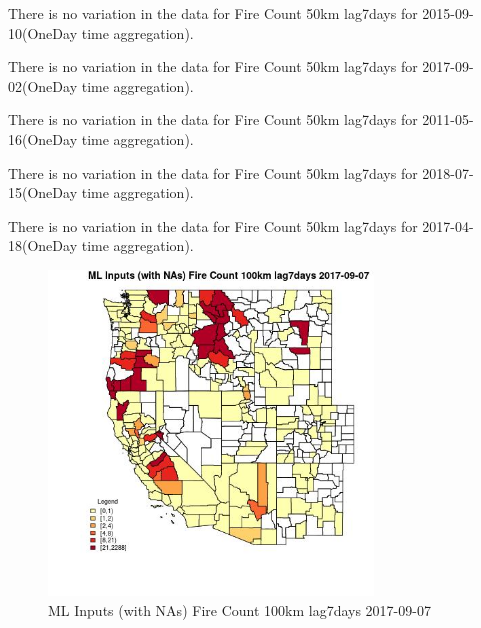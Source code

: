 There is no variation in the data for Fire Count 50km lag7days for 2015-09-10(OneDay time aggregation). 
 

There is no variation in the data for Fire Count 50km lag7days for 2017-09-02(OneDay time aggregation). 
 

There is no variation in the data for Fire Count 50km lag7days for 2011-05-16(OneDay time aggregation). 
 

There is no variation in the data for Fire Count 50km lag7days for 2018-07-15(OneDay time aggregation). 
 

There is no variation in the data for Fire Count 50km lag7days for 2017-04-18(OneDay time aggregation). 
 

\clearpage 

\begin{figure} 
\centering  
\includegraphics[width=0.77\textwidth]{Code_Outputs/Report_ML_input_PM25_Step4_part_e_de_duplicated_aves_compiled_2019-05-21wNAs_CountyFire_Count_100km_lag7daysMean2017-09-07.jpg} 
\caption{\label{fig:Report_ML_input_PM25_Step4_part_e_de_duplicated_aves_compiled_2019-05-21wNAsCountyFire_Count_100km_lag7daysMean2017-09-07}ML Inputs (with NAs) Fire Count 100km lag7days 2017-09-07} 
\end{figure} 
 

